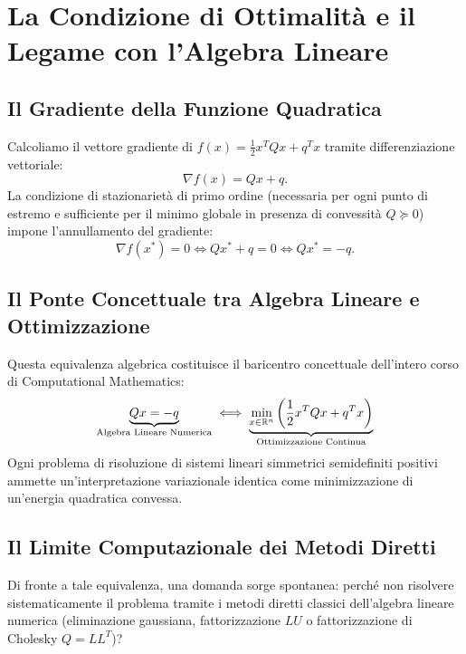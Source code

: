 \FloatBarrier
\section{La Condizione di Ottimalit\`a e il Legame con l'Algebra Lineare}
\label{sec:condizione-ottimalita-algebra-lineare}

\subsection{Il Gradiente della Funzione Quadratica}
Calcoliamo il vettore gradiente di $f(x) = \frac{1}{2} x^T Q x + q^T x$ tramite differenziazione vettoriale:
\begin{equation}
    \nabla f(x) = Qx + q.
\end{equation}
La condizione di stazionariet\`a di primo ordine (necessaria per ogni punto di estremo e sufficiente per il minimo globale in presenza di convessit\`a $Q \succeq 0$) impone l'annullamento del gradiente:
\begin{equation}
    \nabla f(x^*) = 0 \iff Q x^* + q = 0 \iff Q x^* = -q.
\end{equation}

\subsection{Il Ponte Concettuale tra Algebra Lineare e Ottimizzazione}
Questa equivalenza algebrica costituisce il baricentro concettuale dell'intero corso di Computational Mathematics:
\begin{equation}
    \underbrace{Qx = -q}_{\text{Algebra Lineare Numerica}} \iff \underbrace{\min_{x \in \mathbb{R}^n} \left(\frac{1}{2}x^T Qx + q^T x\right)}_{\text{Ottimizzazione Continua}}
\end{equation}
Ogni problema di risoluzione di sistemi lineari simmetrici semidefiniti positivi ammette un'interpretazione variazionale identica come minimizzazione di un'energia quadratica convessa.

\subsection{Il Limite Computazionale dei Metodi Diretti}
Di fronte a tale equivalenza, una domanda sorge spontanea: perch\'e non risolvere sistematicamente il problema tramite i metodi diretti classici dell'algebra lineare numerica (eliminazione gaussiana, fattorizzazione $LU$ o fattorizzazione di Cholesky $Q = L L^T$)?

